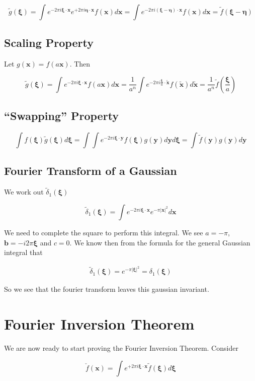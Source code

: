 \documentclass[12pt]{article}
\newcommand{\bv}[1]{\boldsymbol{#1}}
\begin{document}
\[
\tilde{g}(\bv{\xi}) = \int e^{-2\pi i \bv{\xi} \cdot \bv{x}} e^{+2\pi i \bv{\eta} \cdot \bv{x}} f(\bv{x}) d\bv{x}
= \int e^{- 2 \pi i (\bv{\xi} -\bv{\eta}) \cdot \bv{x}} f(\bv{x}) d\bv{x} = \tilde{f}(\bv{\xi} - \bv{\eta})
\]

\subsection{Scaling Property}
Let $g(\bv{x}) = f(a\bv{x})$. Then

\[
\tilde{g}(\bv{\xi}) = \int e^{-2\pi i \bv{\xi} \cdot \bv{x}} f(a\bv{x}) d\bv{x} = \frac{1}{a^n} \int e^{-2 \pi i \frac{\bv{\xi}}{a} \cdot \tilde{\bv{x}}} f(\tilde{\bv{x}}) d\tilde{\bv{x}} = \frac{1}{a^n} \tilde{f}\left(\frac{\bv{\xi}}{a}\right)
\]

\subsection{``Swapping'' Property}
\[
\int f(\bv{\xi}) \tilde{g}(\bv{\xi}) d\bv{\xi} = \int \int e^{-2\pi i \bv{\xi} \cdot \bv{y}} f(\bv{\xi}) g(\bv{y}) d\bv{y} d\bv{\xi} = \int \tilde{f}(\bv{y}) g(\bv{y}) d\bv{y}
\]

\subsection{Fourier Transform of a Gaussian}
We work out $\tilde{\delta}_{1}(\bv{\xi})$

\[
\tilde{\delta}_{1}(\bv{\xi}) = \int e^{-2 \pi i \bv{\xi} \cdot \bv{x}} e^{-\pi |\bv{x}|^2} d\bv{x}
\]

We need to complete the square to perform this integral. We see $a=-\pi$, $\bv{b}=-i2\pi \bv{\xi}$ and $c=0$. 
We know then from the formula for the general Gaussian integral that

\begin{align}
\tilde{\delta}_1(\bv{\xi}) = e^{-\pi |\bv{\xi}|^2} = \delta_1(\bv{\xi})
\end{align}

So we see that the fourier transform leaves this gaussian invariant.

\section{Fourier Inversion Theorem}

We are now ready to start proving the Fourier Inversion Theorem.
Consider

\[
\check{f}(\bv{x}) = \int e^{+ 2 \pi i \bv{\xi} \cdot \bv{x}} \tilde{f}(\bv{\xi}) d\bv{\xi}
\]
\end{document}

